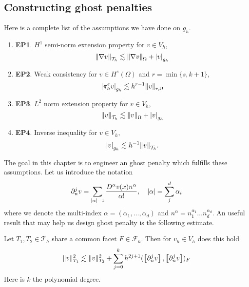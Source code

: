 \subsection{Constructing ghost penalties}%
\label{sub:constructing_ghost_penalties}

Here is a complete list of the assumptions we have done on $g_{h}$.

\begin{enumerate}[label=(\roman*)]
\item \textbf{EP1}.
    $H^{1}$ semi-norm extension property for $v \in  V_{h}$,
    \begin{equation}
        \label{eq:EP1}
    \| \nabla v \|_{ \mathcal{T} _{h} }^{  }  \lesssim \| \nabla v \|_{ \Omega  }^{  }  + \left\lvert  v  \right\rvert _{g_{h}}
    \end{equation}
\item \textbf{EP2}.
    Weak consistency for $v \in H^{s}( \Omega ) $ and $r = \min\{s, k+1\} $,
    \begin{equation}
        \label{eq:EP2}
    \left\lvert  \pi ^{e}_{h} v  \right\rvert_{g_{h}} \lesssim  h^{r-1} \| v \|_{ r,\Omega  }^{  }
    \end{equation}

\item \textbf{EP3}.
    $L^{2}$ norm extension property for $v \in V_{h}$,
    \begin{equation}
    \label{eq:EP3}
    \| v \|_{ \mathcal{T} _{h} }^{  } \lesssim \| v  \|_{\Omega   }^{  }   + \left\lvert  v  \right\rvert _{g_{h}}
    \end{equation}
    \item\textbf{EP4}.
    Inverse inequality for $v \in  V_{h}$,
    \begin{equation}
    \label{eq:EP4}
    \left\lvert  v  \right\rvert _{g_{h}} \lesssim h^{-1} \| v \|_{ \mathcal{T} _{h} }^{  } .
    \end{equation}

\end{enumerate}


The goal in this chapter is to engineer an ghost penalty which fulfills these assumptions.
Let us introduce the notation \[
\partial _{n}^{j} v = \sum_{\left\lvert  \alpha   \right\rvert =1 }^{} \frac{D^{\alpha }v( x) n^{\alpha }}{\alpha !}, \quad \left\lvert  \alpha   \right\rvert = \sum_{j}^{d} \alpha_{i}
\]
where we denote the multi-index $\alpha  = ( \alpha _{1}, \ldots, \alpha _{d})  $  and $n^{\alpha } = n_{1}^{\alpha _{1}} \ldots n_{d}^{\alpha _{d}}$. An useful result that may help us design ghost penalty is the following estimate.
\begin{lemma}
    \label{lemma:local_facet_estimate}
    Let $T_{1}, T_{2} \in  \mathcal{T} _{h} $ share a common facet $F \in \mathcal{F}_{h} $. Then for $v_{h} \in  V_{h}$  does this hold \[
    \| v \|_{ T_{1} }^{  2}  \lesssim  \| v \|_{ T_{2} }^{2  }  + \sum_{j=0}^{k}  h^{2j +1} ( \jump{ \partial _{n}^{j} v}, \jump{ \partial _{n}^{j} v}    )_{F}
    \]
        Here is $k$ the polynomial degree.
\end{lemma}

